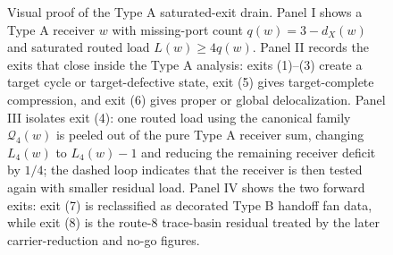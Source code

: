\documentclass[11pt]{article}
\begin{document}
\begin{figure}[t]
{%
}
\caption[Visual proof of the Type A saturated-exit drain]{Visual proof of the Type A saturated-exit drain.  Panel I shows a Type A receiver \(w\) with missing-port count \(q(w)=3-d_X(w)\) and saturated routed load \(L(w)\ge4q(w)\).  Panel II records the exits that close inside the Type A analysis: exits (1)--(3) create a target cycle or target-defective state, exit (5) gives target-complete compression, and exit (6) gives proper or global delocalization.  Panel III isolates exit (4): one routed load using the canonical family \(\mathcal Q_4(w)\) is peeled out of the pure Type A receiver sum, changing \(L_4(w)\) to \(L_4(w)-1\) and reducing the remaining receiver deficit by \(1/4\); the dashed loop indicates that the receiver is then tested again with smaller residual load.  Panel IV shows the two forward exits: exit (7) is reclassified as decorated Type B handoff fan data, while exit (8) is the route-8 trace-basin residual treated by the later carrier-reduction and no-go figures.}
\label{fig:typeA-saturated-exit-drain}
\end{figure}
\end{document}
